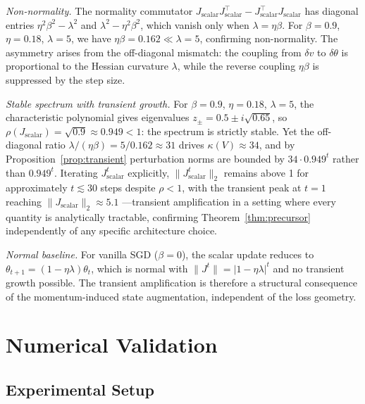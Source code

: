 \documentclass[aps,prresearch,twocolumn,superscriptaddress,longbibliography]{revtex4-2}
\begin{document}
\emph{Non-normality.}
The normality commutator $J_{\mathrm{scalar}}J_{\mathrm{scalar}}^\top
- J_{\mathrm{scalar}}^\top J_{\mathrm{scalar}}$ has diagonal entries
$\eta^2\beta^2 - \lambda^2$ and $\lambda^2 - \eta^2\beta^2$, which
vanish only when $\lambda = \eta\beta$.
For $\beta=0.9$, $\eta=0.18$, $\lambda=5$, we have
$\eta\beta = 0.162\ll\lambda = 5$, confirming non-normality.
The asymmetry arises from the off-diagonal mismatch: the coupling from
$\delta v$ to $\delta\theta$ is proportional to the Hessian curvature
$\lambda$, while the reverse coupling $\eta\beta$ is suppressed by the
step size.

\emph{Stable spectrum with transient growth.}
For $\beta=0.9$, $\eta=0.18$, $\lambda=5$, the characteristic
polynomial gives eigenvalues
$z_\pm = 0.5 \pm i\sqrt{0.65}$,
so $\rho(J_{\mathrm{scalar}}) = \sqrt{0.9}\approx 0.949 < 1$: the
spectrum is strictly stable.
Yet the off-diagonal ratio $\lambda/(\eta\beta) = 5/0.162\approx 31$
drives $\kappa(V)\approx 34$, and by Proposition~\ref{prop:transient}
perturbation norms are bounded by $34\cdot 0.949^t$ rather than
$0.949^t$.
Iterating $J_{\mathrm{scalar}}^t$ explicitly, $\|J_{\mathrm{scalar}}^t\|_2$
remains above 1 for approximately $t \lesssim 30$ steps despite $\rho < 1$,
with the transient peak at $t=1$ reaching $\|J_{\mathrm{scalar}}\|_2 \approx 5.1$ ---transient amplification
in a setting where every quantity is analytically tractable, confirming
Theorem~\ref{thm:precursor} independently of any specific architecture
choice.

\emph{Normal baseline.}
For vanilla SGD ($\beta=0$), the scalar update reduces to
$\theta_{t+1} = (1-\eta\lambda)\theta_t$, which is normal with
$\|J^t\| = |1-\eta\lambda|^t$ and no transient growth possible.
The transient amplification is therefore a structural consequence of the
momentum-induced state augmentation, independent of the loss geometry.


\section{Numerical Validation}
\label{sec:numerics}

\subsection{Experimental Setup}
\end{document}
